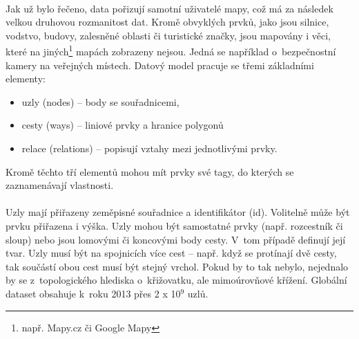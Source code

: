 \documentclass[11pt,a4paper,titlepage,oneside]{book}
\begin{document}
		\paragraph{} Jak už bylo řečeno, data pořizují samotní uživatelé mapy, což má za následek velkou druhovou rozmanitost dat. Kromě obvyklých prvků, jako jsou silnice, vodstvo, budovy, zalesněné oblasti či turistické značky, jsou mapovány i věci, které na jiných\footnote{např. Mapy.cz či Google Mapy} mapách zobrazeny nejsou. Jedná se například o~bezpečnostní kamery na veřejných místech. Datový model pracuje se třemi základními elementy:
	\begin{itemize}
		\item uzly (nodes) -- body se souřadnicemi,


		\item cesty (ways) -- liniové prvky a hranice polygonů


		\item relace (relations) -- popisují vztahy mezi jednotlivými prvky.
	\end{itemize}
Kromě těchto tří elementů mohou mít prvky své tagy, do kterých se zaznamenávají  vlastnosti. 	


		\paragraph{}Uzly mají přiřazeny zeměpisné souřadnice a identifikátor (id). Volitelně může být prvku přiřazena i výška. Uzly mohou být samostatné prvky (např. rozcestník či sloup) nebo jsou lomovými či koncovými body cesty. V~tom případě definují její tvar. Uzly musí být na spojnicích více cest -- např. když se protínají dvě cesty, tak součástí obou cest musí být stejný vrchol. Pokud by to tak nebylo, nejednalo by se z~topologického hlediska o~křižovatku, ale mimoúrovňové křížení. Globální dataset obsahuje k~roku 2013 přes 2 x 10$^9$ uzlů\cite{osm_wiki_node}.

\end{document}
